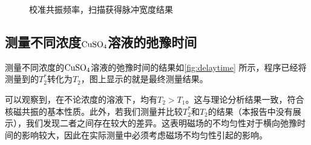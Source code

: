 \documentclass[font=default]{mpltx}
\begin{document}
\begin{figure}[htbp]
{\begin{minipage}[b]{0.48\linewidth}
    \end{minipage}
  }
  \caption{校准共振频率，扫描获得脉冲宽度结果} %
  \label{fig:reso_freq}  %
\end{figure}
\subsection{测量不同浓度${\rm CuSO_4}$溶液的弛豫时间}
测量不同浓度的${\rm CuSO_4}$溶液的弛豫时间的结果如\autoref{fig:delaytime} 所示，程序已经将测量到的$T_2^*$转化为$T_2$，图上显示的就是最终测量结果。

可以观察到，在不论浓度的溶液下，均有$T_2 > T_1$。这与理论分析结果一致，符合核磁共振的基本性质。此外，若我们测量并比较$T_2^*$和$T_2$的结果（本报告中没有展示），我们发现二者之间存在较大的差异。这表明磁场的不均匀性对于横向弛豫时间的影响较大，因此在实际测量中必须考虑磁场不均匀性引起的影响。
\end{document}
